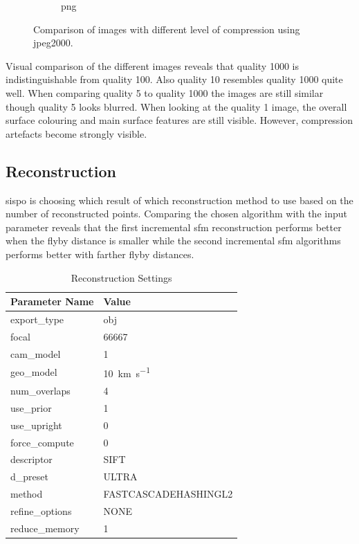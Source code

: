 \begin{figure}[htb]
\begin{subfigure}[b]{0.47\textwidth}
            \caption{\gls{png}}
            \label{fig:img_quality_png}
        \end{subfigure}
    \caption{Comparison of images with different level of compression using \gls{jpeg}2000.}
    \label{fig:img_quality_comp}
\end{figure}

Visual comparison of the different images reveals that quality 1000 is indistinguishable from quality 100. Also quality 10 resembles quality 1000 quite well. When comparing quality 5 to quality 1000 the images are still similar though quality 5 looks blurred. When looking at the quality 1 image, the overall surface colouring and main surface features are still visible. However, compression artefacts become strongly visible.

\subsection{Reconstruction}
\gls{sispo} is choosing which result of which reconstruction method to use based on the number of reconstructed points. Comparing the chosen algorithm with the input parameter reveals that the first incremental \gls{sfm} reconstruction performs better when the flyby distance is smaller while the second incremental \gls{sfm} algorithms performs better with farther flyby distances.

\begin{table}[htb]
    \centering
    \caption{Reconstruction Settings}
    \label{tab:comp_settings}
    \begin{tabular}{l|l}
        \textbf{Parameter Name} & \textbf{Value} \\ \hline
        export\_type       & obj   \\
        focal & 66667 \\
        cam\_model & \SI{1}{}     \\
        geo\_model & \SI{10}{\kilo\meter\per\second} \\
        num\_overlaps  & \SI{4}{} \\
        use\_prior & \SI{1}{} \\
        use\_upright & \SI{0}{} \\
        force\_compute & \SI{0}{} \\
        descriptor & SIFT \\
        d\_preset & ULTRA \\
        method & FASTCASCADEHASHINGL2 \\
        refine\_options & NONE \\
        reduce\_memory & 1
    \end{tabular}
\end{table}

